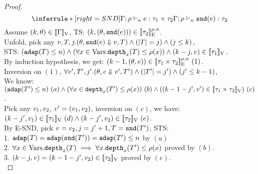 \documentclass[a4paper,11pt]{article}
\theoremstyle{definition}
\begin{document}
\begin{proof}
\[
    \inferrule*[right = SND]{
      \Gamma; \dmap \tvdash{\nnatA} \expr: \type_1 \times \type_2
    }{
      \Gamma; \dmap \tvdash{\nnatA} \eprojr(\expr): \type_2
    }
\]
Assume $(k, \theta) \in [\![ \Gamma ]\!]_{\text{V}}$, TS: $(k, (\theta, \mathtt{snd}(e))) \in [\![ \tau_2 ]\!]_{\text{E}}^{\rho, n} $.\\
%
Unfold, pick any $ v, T, j. (\theta, \mathtt{snd}(e) \mathrel{\Downarrow} v, T) \land (|T| = j) \land (j \leq k) $,\\
%
STS: $ (\mathtt{adap}(T) \leq n) \land (\forall x \in \mbox{Vars}. \mathtt{depth}_{x}(T) \leq \rho(x)) \land (k - j, v) \in [\![ \tau_1 ]\!]_{\text{V}} $.\\
%
By induction hypothesis, we get: $(k-1, (\theta, e)) \in [\![ \tau_1 \times \tau_2 ]\!]_{\text{E}}^{\rho, n} ~(1)$.\\
%
Inversion on $(1)$, $\forall v', T', j'. (\theta, e \mathrel{\Downarrow} v', T') \land (|T'| = j') \land (j' \leq k-1) $,\\
%
We know: $(\mathtt{adap}(T') \leq n) ~ (a) 
\land (\forall x \in \mathtt{depth}_{x}(T') \leq \rho(x)) ~ (b)
\land ((k -1- j', v') \in [\![ \tau_1 \times \tau_2 ]\!]_{\text{V}}) ~ (c)$.\\
%
Pick any $v_1, v_2$, $v' = (v_1, v_2)$,
%
inversion on $(c)$, we have:\\
%
$(k - j', v_1) \in [\![ \tau_1 ]\!]_{\text{V}}~(d) \land (k - j', v_2) \in [\![ \tau_2 ]\!]_{\text{V}}~(e)$.\\
%
By E-SND, pick $v = v_2, j = j'+1, T = \mathtt{snd}(T')$, STS:\\
%
1. $\mathtt{adap}(T) = \mathtt{adap}(\mathtt{snd}(T')) = \mathtt{adap}(T') \leq n$ by $(a)$\\
%
2. $\forall x \in \mbox{Vars} .\mathtt{depth}_{x}(T) \implies \forall x . \mathtt{depth}_{x}(T') \leq
\rho(x)$ proved by $(b)$.\\
%
3. $(k - j, v) = (k -1 - j', v_2) \in [\![ \tau_2 ]\!]_{\text{V}}$
proved by $(e)$.\\



\end{proof}
\end{document}
